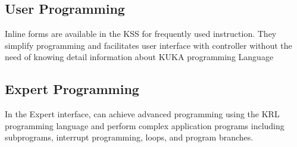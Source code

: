 \subsection{User Programming}
Inline forms are available in the KSS for frequently used instruction. They simplify programming and facilitates user interface with controller without the need of knowing detail information about KUKA programming Language

 \subsection{Expert Programming}
 In the Expert interface, can achieve advanced programming using the KRL programming language and perform complex application programs including subprograms, interrupt programming, loops, and program branches. 
 

%